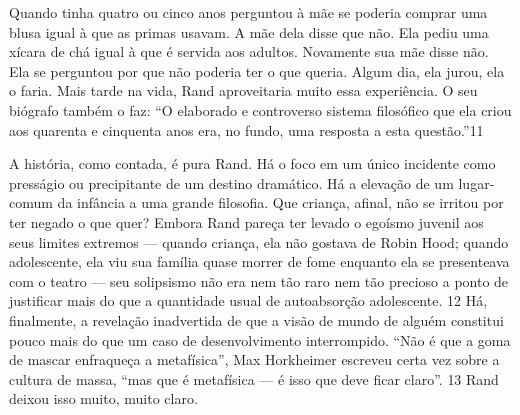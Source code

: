  \par 
Quando tinha quatro ou cinco anos perguntou à mãe se poderia comprar uma blusa igual à que as primas usavam. A mãe dela disse que não. Ela pediu uma xícara de chá igual à que é servida aos adultos. Novamente sua mãe disse não. Ela se perguntou por que não poderia ter o que queria. Algum dia, ela jurou, ela o faria. Mais tarde na vida, Rand aproveitaria muito essa experiência. O seu biógrafo também o faz: “O elaborado e controverso sistema filosófico que ela criou aos quarenta e cinquenta anos era, no fundo, uma resposta a esta questão.”{\color{blue}11}
 \par 
A história, como contada, é pura Rand. Há o foco em um único incidente como presságio ou precipitante de um destino dramático. Há a elevação de um lugar-comum da infância a uma grande filosofia. Que criança, afinal, não se irritou por ter negado o que quer? Embora Rand pareça ter levado o egoísmo juvenil aos seus limites extremos — quando criança, ela não gostava de Robin Hood; quando adolescente, ela viu sua família quase morrer de fome enquanto ela se presenteava com o teatro — seu solipsismo não era nem tão raro nem tão precioso a ponto de justificar mais do que a quantidade usual de autoabsorção adolescente. {\color{blue}12} Há, finalmente, a revelação inadvertida de que a visão de mundo de alguém constitui pouco mais do que um caso de desenvolvimento interrompido. “Não é que a goma de mascar enfraqueça a metafísica”, Max Horkheimer escreveu certa vez sobre a cultura de massa, “mas que é metafísica — é isso que deve ficar claro”. {\color{blue}13} Rand deixou isso muito, muito claro.
 \par 

